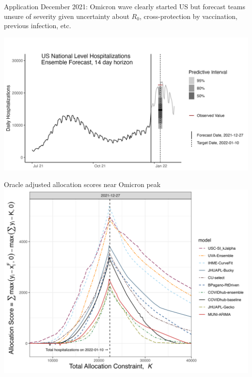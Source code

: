 \documentclass[
  9pt,
  ignorenonframetext,
]{beamer}
\begin{document}
\begin{frame}{Application}
\protect\hypertarget{application}{}
December 2021: Omicron wave clearly started US but forecast teams unsure
of severity given uncertainty about \(R_0\), cross-protection by
vaccination, previous infection, etc.

\includegraphics{../plots/output/nat_hosps.png}
\end{frame}

\begin{frame}{Oracle adjusted allocation scores near Omicron peak}
\protect\hypertarget{oracle-adjusted-allocation-scores-near-omicron-peak}{}
\includegraphics{../plots/output/peak_alloscore.png}
\end{frame}
\end{document}
